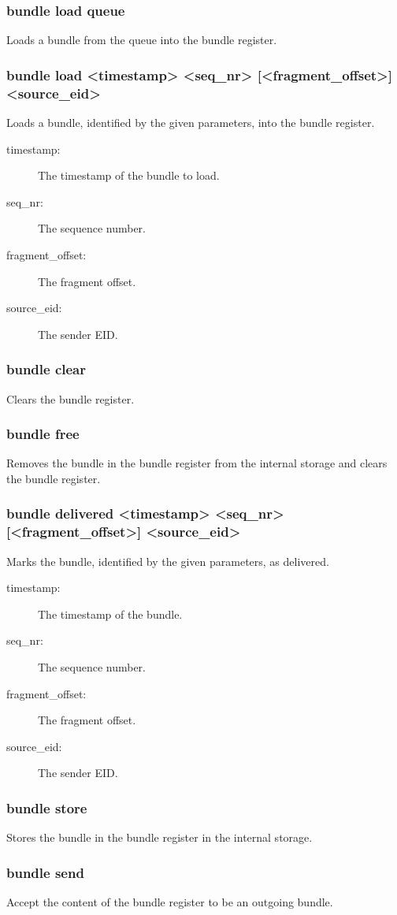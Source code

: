 \documentclass[12pt, a4paper]{scrartcl}
\begin{document}
\subsubsection*{bundle load queue}
Loads a bundle from the queue into the bundle register.
\subsubsection*{bundle load <timestamp> <seq\_nr> [<fragment\_offset>] <source\_eid>}
Loads a bundle, identified by the given parameters, into the bundle register.
\begin{description}
\item[timestamp:] The timestamp of the bundle to load.
\item[seq\_nr:] The sequence number.
\item[fragment\_offset:] The fragment offset.
\item[source\_eid:] The sender EID.
\end{description}
\subsubsection*{bundle clear}
Clears the bundle register.
\subsubsection*{bundle free}
Removes the bundle in the bundle register from the internal storage and clears the bundle register.
\subsubsection*{bundle delivered <timestamp> <seq\_nr> [<fragment\_offset>] <source\_eid>}
Marks the bundle, identified by the given parameters, as delivered.
\begin{description}
\item[timestamp:] The timestamp of the bundle.
\item[seq\_nr:] The sequence number.
\item[fragment\_offset:] The fragment offset.
\item[source\_eid:] The sender EID.
\end{description}
\subsubsection*{bundle store}
Stores the bundle in the bundle register in the internal storage.
\subsubsection*{bundle send}
Accept the content of the bundle register to be an outgoing bundle.
\end{document}
